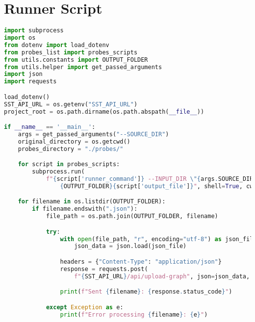 \section{Runner Script}\label{appendix_sec:py_runner_script}
\begin{lstlisting}[language=Python]
import subprocess
import os
from dotenv import load_dotenv
from probes_list import probes_scripts
from utils.constants import OUTPUT_FOLDER
from utils.helper import get_passed_arguments
import json
import requests

load_dotenv()
SST_API_URL = os.getenv("SST_API_URL")
project_root = os.path.dirname(os.path.abspath(__file__))

if __name__ == '__main__':
    args = get_passed_arguments("--SOURCE_DIR")
    original_directory = os.getcwd()
    probes_directory = "./probes/"

    for script in probes_scripts:
        subprocess.run(
            f"{script['runner_command']} --INPUT_DIR \"{args.SOURCE_DIR}\" --OUTPUT \
                {OUTPUT_FOLDER}{script['output_file']}", shell=True, cwd=project_root)

    for filename in os.listdir(OUTPUT_FOLDER):
        if filename.endswith(".json"):
            file_path = os.path.join(OUTPUT_FOLDER, filename)

            try:
                with open(file_path, "r", encoding="utf-8") as json_file:
                    json_data = json.load(json_file)

                headers = {"Content-Type": "application/json"}
                response = requests.post(
                    f"{SST_API_URL}/api/upload-graph", json=json_data, headers=headers)

                print(f"Sent {filename}: {response.status_code}")

            except Exception as e:
                print(f"Error processing {filename}: {e}")
\end{lstlisting}